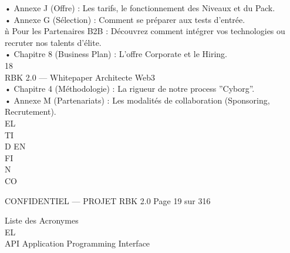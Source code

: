 • Annexe J (Offre) : Les tarifs, le fonctionnement des Niveaux et du Pack.\\
• Annexe G (Sélection) : Comment se préparer aux tests d’entrée.\\
\vspace{0.5em}
ǹ Pour les Partenaires B2B : Découvrez comment intégrer vos technologies ou recruter nos talents d’élite.\\
\vspace{0.5em}
• Chapitre 8 (Business Plan) : L’offre Corporate et le Hiring.\\
\vspace{0.5em}
\vspace{0.5em}
\vspace{0.5em}
18\\
RBK 2.0 — Whitepaper Architecte Web3\\
\vspace{0.5em}
\vspace{0.5em}
• Chapitre 4 (Méthodologie) : La rigueur de notre process ”Cyborg”.\\
• Annexe M (Partenariats) : Les modalités de collaboration (Sponsoring, Recrutement).\\
\vspace{0.5em}
\vspace{0.5em}
\vspace{0.5em}
\vspace{0.5em}
EL\\
TI\\
D   EN\\
FI\\
N\\
CO\\
\vspace{0.5em}
\vspace{0.5em}
\vspace{0.5em}
\vspace{0.5em}
\begin{confidential}CONFIDENTIEL — PROJET RBK 2.0                             Page 19 sur 316\end{confidential}
Liste des Acronymes\\
\vspace{0.5em}
\vspace{0.5em}
\vspace{0.5em}
\vspace{0.5em}
EL\\
API Application Programming Interface\\
\vspace{0.5em}
\vspace{0.5em}
